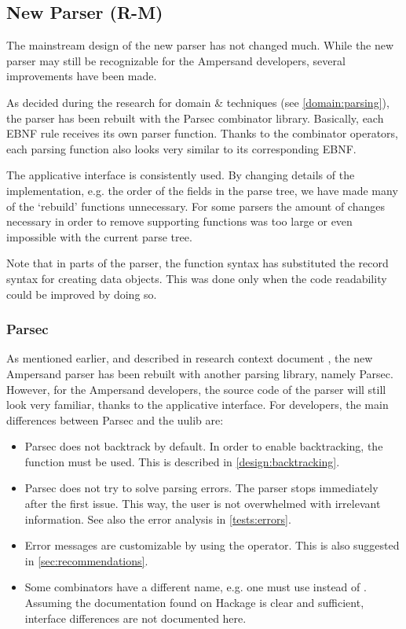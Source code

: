 
\subsection{New Parser (R-M)}
\label{design:new-parser}
The mainstream design of the new parser has not changed much.
While the new parser may still be recognizable for the Ampersand developers, several improvements have been made.

As decided during the research for domain \& techniques (see \autoref{domain:parsing}), the parser has been rebuilt with the Parsec combinator library.
Basically, each EBNF rule receives its own parser function.
Thanks to the combinator operators, each parsing function also looks very similar to its corresponding EBNF.

The applicative interface is consistently used.
By changing details of the implementation, e.g. the order of the fields in the parse tree, we have made many of the `rebuild' functions unnecessary.
For some parsers the amount of changes necessary in order to remove supporting functions was too large or even impossible with the current parse tree.

Note that in parts of the parser, the function syntax has substituted the record syntax for creating data objects.
This was done only when the code readability could be improved by doing so.

\subsubsection{Parsec}
\label{design:parsing-lib}
As mentioned earlier, and described in research context document , the new Ampersand parser has been rebuilt with another parsing library, namely Parsec.
However, for the Ampersand developers, the source code of the parser will still look very familiar, thanks to the applicative interface.
For developers, the main differences between Parsec and the uulib are:
\begin{itemize}
  \item Parsec does not backtrack by default.
    In order to enable backtracking, the  function must be used.
    This is described in \autoref{design:backtracking}.
  \item Parsec does not try to solve parsing errors.
    The parser stops immediately after the first issue.
   This way, the user is not overwhelmed with irrelevant information.
    See also the error analysis in \autoref{tests:errors}.
  \item Error messages are customizable by using the  operator.
    This is also suggested in \autoref{sec:recommendations}.
  \item Some combinators have a different name, e.g. one must use  instead of .
    Assuming the documentation found on Hackage is clear and sufficient, interface differences are not documented here.
\end{itemize}

